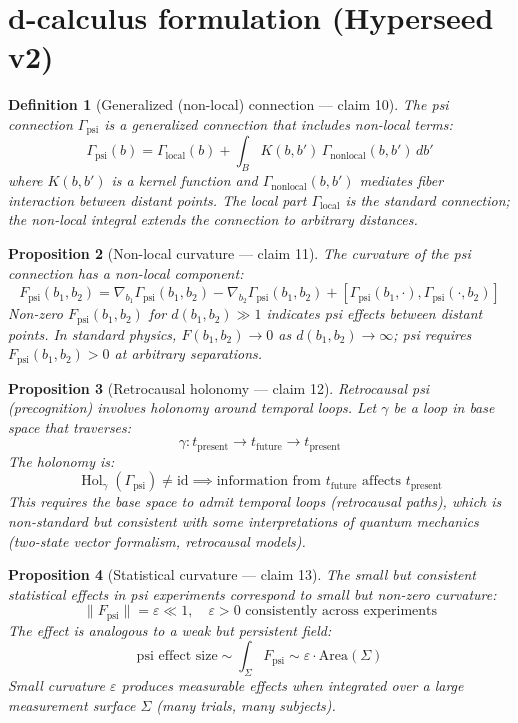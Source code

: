 \documentclass[11pt,a4paper]{article}
\newtheorem{definition}{Definition}[section]
\newtheorem{proposition}[definition]{Proposition}
\begin{document}
\section{d-calculus formulation (Hyperseed v2)}

\begin{definition}[Generalized (non-local) connection --- claim 10]
The \emph{psi connection} $\Gamma_{\text{psi}}$ is a generalized
connection that includes non-local terms:
\[
  \Gamma_{\text{psi}}(b) = \Gamma_{\text{local}}(b) +
    \int_{B} K(b, b')\, \Gamma_{\text{nonlocal}}(b, b')\, db'
\]
where $K(b, b')$ is a kernel function and $\Gamma_{\text{nonlocal}}(b, b')$
mediates fiber interaction between distant points. The local part
$\Gamma_{\text{local}}$ is the standard connection; the non-local
integral extends the connection to arbitrary distances.
\end{definition}

\begin{proposition}[Non-local curvature --- claim 11]
\label{prop:curvature}
The curvature of the psi connection has a non-local component:
\[
  F_{\text{psi}}(b_1, b_2) = \nabla_{b_1} \Gamma_{\text{psi}}(b_1, b_2)
    - \nabla_{b_2} \Gamma_{\text{psi}}(b_1, b_2) +
    [\Gamma_{\text{psi}}(b_1, \cdot), \Gamma_{\text{psi}}(\cdot, b_2)]
\]
Non-zero $F_{\text{psi}}(b_1, b_2)$ for $d(b_1, b_2) \gg 1$ indicates
psi effects between distant points. In standard physics,
$F(b_1, b_2) \to 0$ as $d(b_1, b_2) \to \infty$; psi requires
$F_{\text{psi}}(b_1, b_2) > 0$ at arbitrary separations.
\end{proposition}

\begin{proposition}[Retrocausal holonomy --- claim 12]
\label{prop:retrocausal}
Retrocausal psi (precognition) involves holonomy around temporal loops.
Let $\gamma$ be a loop in base space that traverses:
\[
  \gamma: t_{\text{present}} \to t_{\text{future}} \to t_{\text{present}}
\]
The holonomy is:
\[
  \operatorname{Hol}_\gamma(\Gamma_{\text{psi}}) \neq \mathrm{id}
  \implies \text{information from } t_{\text{future}} \text{ affects }
    t_{\text{present}}
\]
This requires the base space to admit temporal loops (retrocausal
paths), which is non-standard but consistent with some interpretations
of quantum mechanics (two-state vector formalism, retrocausal models).
\end{proposition}

\begin{proposition}[Statistical curvature --- claim 13]
\label{prop:statistical}
The small but consistent statistical effects in psi experiments
correspond to small but non-zero curvature:
\[
  \|F_{\text{psi}}\| = \varepsilon \ll 1, \quad \varepsilon > 0
  \text{ consistently across experiments}
\]
The effect is analogous to a weak but persistent field:
\[
  \text{psi effect size} \sim \int_{\Sigma} F_{\text{psi}} \sim
    \varepsilon \cdot \text{Area}(\Sigma)
\]
Small curvature $\varepsilon$ produces measurable effects when
integrated over a large measurement surface $\Sigma$ (many trials,
many subjects).
\end{proposition}
\end{document}
